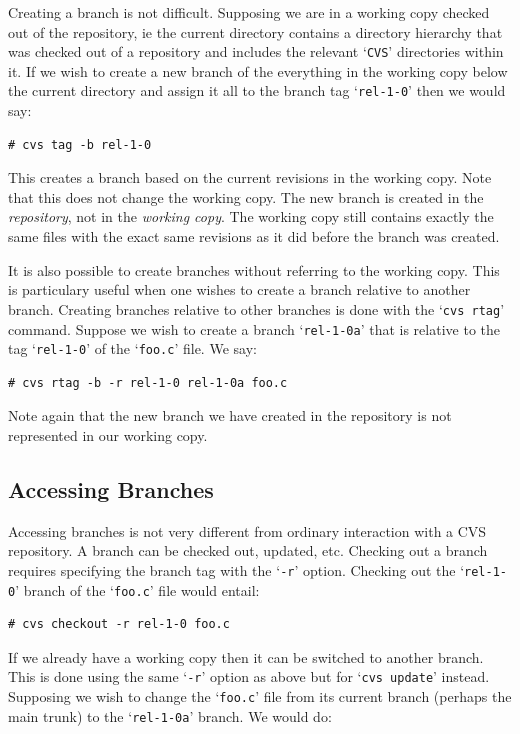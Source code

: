 \documentclass[12pt,letterpaper]{article}
\newcommand{\cmd}[1]{`\texttt{#1}'}
\begin{document}
Creating a branch is not difficult.  Supposing we are in a working copy
checked out of the repository, ie the current directory contains a directory
hierarchy that was checked out of a repository and includes the relevant
\cmd{CVS} directories within it.  If we wish to create a new branch of the
everything in the working copy below the current directory and assign it all
to the branch tag \cmd{rel-1-0} then we would say:

\begin{Verbatim}
# cvs tag -b rel-1-0
\end{Verbatim}

This creates a branch based on the current revisions in the working copy.
Note that this does not change the working copy.  The new branch is created in
the \emph{repository}, not in the \emph{working copy}.  The working copy still
contains exactly the same files with the exact same revisions as it did before
the branch was created.

It is also possible to create branches without referring to the working copy.
This is particulary useful when one wishes to create a branch relative to
another branch.  Creating branches relative to other branches is done with the
\cmd{cvs rtag} command.  Suppose we wish to create a branch \cmd{rel-1-0a}
that is relative to the tag \cmd{rel-1-0} of the \cmd{foo.c} file.  We say:

\begin{Verbatim}
# cvs rtag -b -r rel-1-0 rel-1-0a foo.c
\end{Verbatim}

Note again that the new branch we have created in the repository is not
represented in our working copy.



\subsection{Accessing Branches}

Accessing branches is not very different from ordinary interaction with a CVS
repository.  A branch can be checked out, updated, etc.  Checking out a branch
requires specifying the branch tag with the \cmd{-r} option.  Checking out
the \cmd{rel-1-0} branch of the \cmd{foo.c} file would entail:

\begin{Verbatim}
# cvs checkout -r rel-1-0 foo.c
\end{Verbatim}

If we already have a working copy then it can be switched to another branch.
This is done using the same \cmd{-r} option as above but for \cmd{cvs update}
instead.  Supposing we wish to change the \cmd{foo.c} file from its current
branch (perhaps the main trunk) to the \cmd{rel-1-0a} branch.  We would do:
\end{document}

